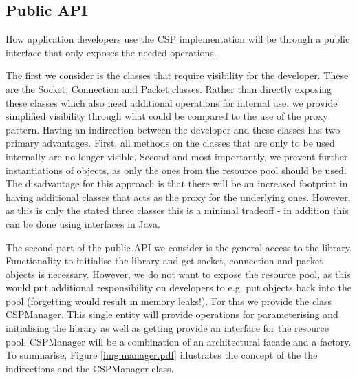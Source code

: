 \subsection{Public API}
How application developers use the CSP implementation will be through a public interface that only exposes the needed operations. 

The first we consider is the classes that require visibility for the developer. These are the Socket, Connection and Packet classes. Rather than directly exposing these classes which also need additional operations for internal use, we provide simplified visibility through what could be compared to the use of the proxy pattern\cite{Gamma:1995:DPE:186897}. Having an indirection between the developer and these classes has two primary advantages. First, all methods on the classes that are only to be used internally are no longer visible. Second and most importantly, we prevent further instantiations of objects, as only the ones from the resource pool should be used. The disadvantage for this approach is that there will be an increased footprint in having additional classes that acts as the proxy for the underlying ones. However, as this is only the stated three classes this is a minimal tradeoff - in addition this can be done using interfaces in Java.

The second part of the public API we consider is the general access to the library. Functionality to initialise the library and get socket, connection and packet objects is necessary. However, we do not want to expose the resource pool, as this would put additional responsibility on developers to e.g. put objects back into the pool (forgetting would result in memory leaks!). For this we provide the class CSPManager. This single entity will provide operations for parameterising and initialising the library as well as getting provide an interface for the resource pool. CSPManager will be a combination of an architectural facade and a factory\cite{Gamma:1995:DPE:186897}. To summarise, Figure \ref{img:manager.pdf} illustrates the concept of the the indirections and the CSPManager class.
